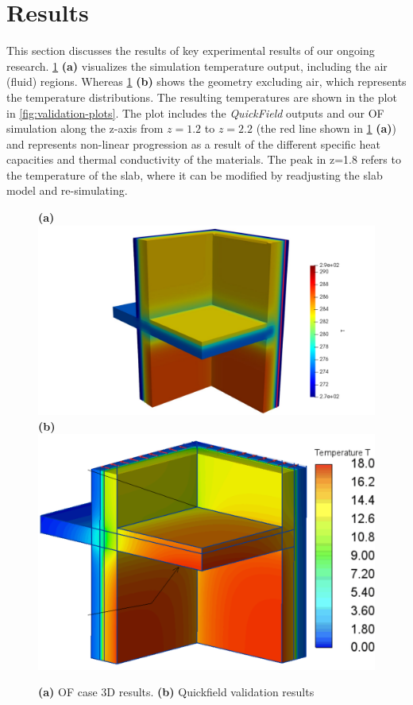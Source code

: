 \afterpage{\clearpage}
\section{Results}

This section discusses the results of key experimental results of our ongoing research. 
\cref{paraview} \textbf{(a)} visualizes the simulation temperature output, including the air (fluid) regions. Whereas
\cref{paraview} \textbf{(b)} shows the geometry excluding air, which represents the temperature distributions. The resulting temperatures are shown in the plot in \cref{fig:validation-plots}. The plot includes the \textit{QuickField} outputs and our  \gls{OF} simulation along the z-axis from $z= 1.2$ to $z=2.2$ (the red line shown in \cref{paraview} \textbf{(a)}) and represents non-linear progression as a result of the different specific heat capacities and thermal conductivity of the materials. The peak in z=1.8 refers to the temperature of the slab, where it can be modified by readjusting the slab model and re-simulating. 



\begin{figure}[htb]
    \centering
    \textbf{(a)}\includegraphics[trim=5cm 0cm 4.5cm 0cm, clip, width=0.70\linewidth]{Figures/newvalleg.pdf}
    \textbf{(b)}\includegraphics[width=0.65\columnwidth]{Figures/ValidationCaseClean.png}
\hspace{0.7cm}
    \caption[3D Validation Visualization]{\textbf{(a)} \gls{OF} case 3D results. \textbf{(b)} Quickfield validation results}
    \label{paraview}
\end{figure}




